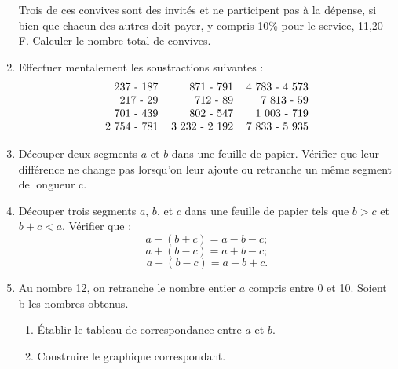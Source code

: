 \begin{enumerate}
 Trois de ces convives sont des invités et ne participent pas à la dépense,
 si bien que chacun des autres doit payer, y compris 10\% pour le service,
 11,20 F. Calculer le nombre total de convives.
 \item Effectuer mentalement les soustractions suivantes : 
 \[\begin{tabular}{rrr}
 237 - 187 & 871 - 791 & 4~783 - 4~573 \\
 217 - 29 & 712 - 89 & 7~813 - 59 \\
 701 - 439 & 802 - 547 & 1~003 - 719 \\ 
 2~754 - 781 & 3~232 - 2~192 & 7~833 - 5~935
\end{tabular}\]
 
 \item Découper deux segments $a$ et $b$ dans une feuille de papier.
 Vérifier que leur différence ne change pas lorsqu'on leur ajoute ou retranche un même segment de longueur c. 
 
 \item Découper trois segments $a$, $b$, et $c$ dans une feuille de papier tels que $b> c$ et $ b + c < a$. Vérifier que : 
 \[ a - (b+c) = a - b - c;\]
 \[ a + (b - c) = a + b - c ;\]
 \[ a - (b - c) = a - b + c.\] 
 
 \item Au nombre 12, on retranche le nombre entier $a$ compris entre 0 et 10. Soient b les nombres obtenus. 
 \begin{enumerate}
 \item Établir le tableau de correspondance entre $a$ et $b$. 
 \item Construire le graphique correspondant.
 \end{enumerate}
 
 \end{enumerate}
 